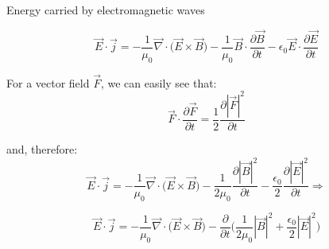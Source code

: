 \begin{frame}{Energy carried by electromagnetic waves}


\begin{equation*}
 \vec{E} \cdot \vec{j} =
    - \frac{1}{\mu_0} \vec{\nabla} \cdot \Big( \vec{E} \times \vec{B} \Big)
    - \frac{1}{\mu_0} \vec{B} \cdot \frac{\partial \vec{B}}{\partial t} - \epsilon_0 \vec{E} \cdot \frac{\partial \vec{E}}{\partial t}
\end{equation*}

For a vector field $\vec{F}$, we can easily see that:
\begin{equation*}
  \vec{F} \cdot \frac{\partial \vec{F}}{\partial t} = \frac{1}{2} \frac{\partial |\vec{F}|^2}{\partial t}
\end{equation*}

and, therefore:
\begin{equation*}
 \vec{E} \cdot \vec{j} =
    - \frac{1}{\mu_0} \vec{\nabla} \cdot \Big( \vec{E} \times \vec{B} \Big)
    - \frac{1}{2\mu_0} \frac{\partial |\vec{B}|^2}{\partial t} - \frac{\epsilon_0}{2} \frac{\partial |\vec{E}|^2}{\partial t} \Rightarrow
\end{equation*}

\begin{equation*}
 \vec{E} \cdot \vec{j} =
    - \frac{1}{\mu_0} \vec{\nabla} \cdot \Big( \vec{E} \times \vec{B} \Big)
    - \frac{\partial}{\partial t} \Big( \frac{1}{2\mu_0} |\vec{B}|^2 + \frac{\epsilon_0}{2} |\vec{E}|^2 \Big)
\end{equation*}

\end{frame}


%
%
%
%

